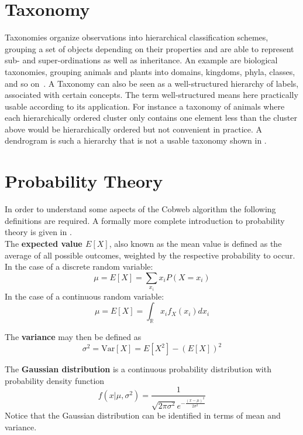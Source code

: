 \section{Taxonomy}\label{\positionnumber}
Taxonomies organize observations into hierarchical classification schemes, grouping a set of objects depending on their properties and are able to represent sub- and super-ordinations as well as inheritance. An example are biological taxonomies, grouping animals and plants into domains, kingdoms, phyla, classes, and so on~\cite{Krcmar2015, han2011data}. A Taxonomy can also be seen as a well-structured hierarchy of labels, associated with certain concepts. The term well-structured means here practically usable according to its application. For instance a taxonomy of animals where each hierarchically ordered cluster only contains one element less than the cluster above would be hierarchically ordered but not convenient in practice. A dendrogram is such a hierarchy that is not a usable taxonomy shown in .

\section{Probability Theory}\label{\positionnumber}
In order to understand some aspects of the Cobweb algorithm the following definitions are required. A formally more complete introduction to probability theory is given in .\\

\noindent The \textbf{expected value $E[X]$}, also known as the mean value is defined as the average of all possible outcomes, weighted by the respective probability to occur.
In the case of a discrete random variable: \[ \mu = E[X] = \sum_{x_i} x_i P(X=x_i)  \]
In the case of a continuous random variable: \[ \mu = E[X] = \int_{\mathbb{R}} x_i f_X(x_i)dx_i  \]

\noindent The \textbf{variance} may then be defined as \[ \sigma^2 = \text{Var}[X] = E[X^2] - (E[X])^2 \]

\noindent The \textbf{Gaussian distribution} is a continuous probability distribution with probability density function \[ f(x | \mu, \sigma^2) = \frac{1}{\sqrt{2 \pi \sigma^2}e^{-\frac{(x-\mu)^2}{2\sigma^2}}} \]
Notice that the Gaussian distribution can be identified in terms of mean and variance.
